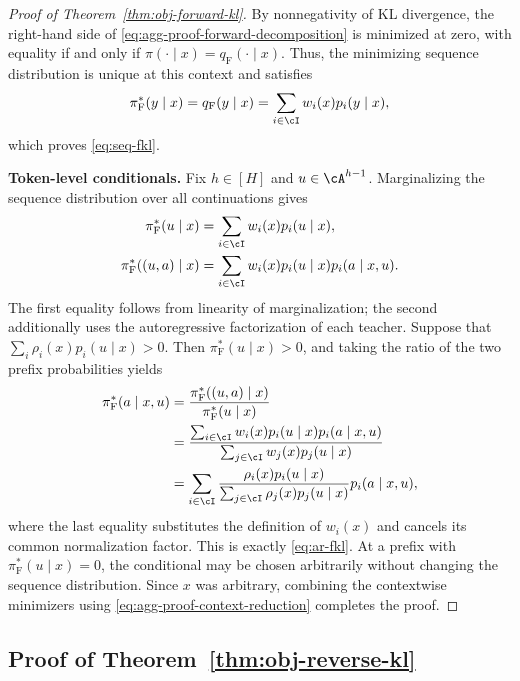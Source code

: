 \documentclass[11pt]{article}
\newcommand{\pif}{\pi_{\mathrm{F}}}
\begin{document}
\begin{proof}[Proof of Theorem~\ref{thm:obj-forward-kl}]
By nonnegativity of KL divergence, the right-hand side of
\eqref{eq:agg-proof-forward-decomposition} is minimized at zero, with
equality if and only if
$\pi(\cdot\mid x)=q_{\mathrm F}(\cdot\mid x)$. Thus, the minimizing
sequence distribution is unique at this context and satisfies
\begin{align*}
    \pif^*(y\mid x)
    =q_{\mathrm F}(y\mid x)
    =\sum_{i\in\cI}w_i(x)p_i(y\mid x),
\end{align*}
which proves \eqref{eq:seq-fkl}.

\textbf{Token-level conditionals.}
Fix $h\in[H]$ and $u\in\cA^{h-1}$. Marginalizing the sequence
distribution over all continuations gives
\begin{align}
    \pif^*(u\mid x)
    &=\sum_{i\in\cI}w_i(x)p_i(u\mid x),\notag\\*
    \pif^*((u,a)\mid x)
    &=\sum_{i\in\cI}w_i(x)p_i(u\mid x)p_i(a\mid x,u).
    \label{eq:agg-proof-forward-prefix}
\end{align}
The first equality follows from linearity of marginalization;
the second additionally uses the autoregressive factorization
of each teacher.
Suppose that $\sum_i\rho_i(x)p_i(u\mid x)>0$. Then
$\pif^*(u\mid x)>0$, and taking the ratio of the two prefix
probabilities yields
\begin{align}
    \pif^*(a\mid x,u)
    &=\frac{\pif^*((u,a)\mid x)}{\pif^*(u\mid x)}\notag\\*
    &=\frac{\sum_{i\in\cI}w_i(x)p_i(u\mid x)p_i(a\mid x,u)}
            {\sum_{j\in\cI}w_j(x)p_j(u\mid x)}\notag\\*
    &=\sum_{i\in\cI}
      \frac{\rho_i(x)p_i(u\mid x)}
           {\sum_{j\in\cI}\rho_j(x)p_j(u\mid x)}
      p_i(a\mid x,u),
    \label{eq:agg-proof-forward-conditional}
\end{align}
where the last equality substitutes the definition of $w_i(x)$
and cancels its common normalization factor. This is exactly
\eqref{eq:ar-fkl}. At a prefix with $\pif^*(u\mid x)=0$, the
conditional may be chosen arbitrarily without changing the
sequence distribution. Since $x$ was arbitrary, combining the
contextwise minimizers using \eqref{eq:agg-proof-context-reduction}
completes the proof.
\end{proof}

\subsection{Proof of Theorem~\ref{thm:obj-reverse-kl}}
\label{app:proof-obj-reverse-kl}
\end{document}
